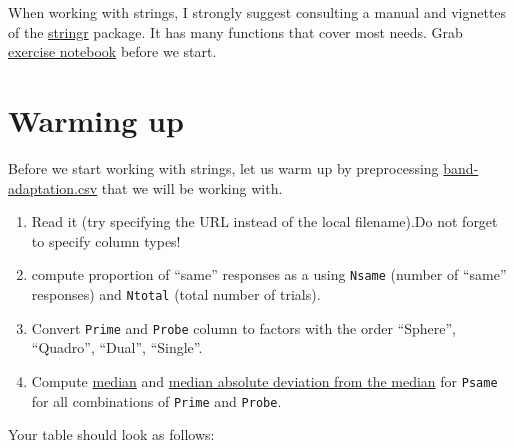\documentclass[
]{book}
\providecommand{\tightlist}{%
  \setlength{\itemsep}{0pt}\setlength{\parskip}{0pt}}
\begin{document}
When working with strings, I strongly suggest consulting a manual and vignettes of the \href{https://stringr.tidyverse.org/index.html}{stringr} package. It has many functions that cover most needs. Grab \href{notebooks/Seminar\%2012\%20-\%20strings.Rmd}{exercise notebook} before we start.

\hypertarget{warming-up}{%
\section{Warming up}\label{warming-up}}

Before we start working with strings, let us warm up by preprocessing \href{data/bands-adaptation.csv}{band-adaptation.csv} that we will be working with.

\begin{enumerate}
\def\labelenumi{\arabic{enumi}.}
\tightlist
\item
  Read it (try specifying the URL instead of the local filename).Do not forget to specify column types!
\item
  compute proportion of ``same'' responses as a using \texttt{Nsame} (number of ``same'' responses) and \texttt{Ntotal} (total number of trials).
\item
  Convert \texttt{Prime} and \texttt{Probe} column to factors with the order ``Sphere'', ``Quadro'', ``Dual'', ``Single''.
\item
  Compute \href{https://stat.ethz.ch/R-manual/R-devel/library/stats/html/median.html}{median} and \href{https://stat.ethz.ch/R-manual/R-devel/library/stats/html/mad.html}{median absolute deviation from the median} for \texttt{Psame} for all combinations of \texttt{Prime} and \texttt{Probe}.
\end{enumerate}

Your table should look as follows:
\end{document}
